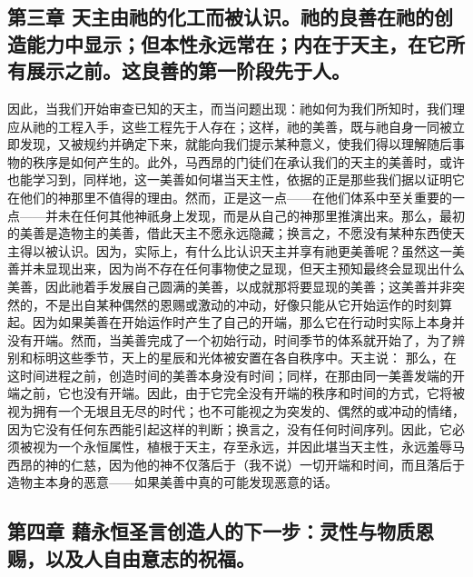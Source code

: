 
\subsection{第三章 天主由祂的化工而被认识。祂的良善在祂的创造能力中显示；但本性永远常在；内在于天主，在它所有展示之前。这良善的第一阶段先于人。}

因此，当我们开始审查已知的天主，而当问题出现：祂如何为我们所知时，我们理应从祂的工程入手，这些工程先于人存在；这样，祂的美善，既与祂自身一同被立即发现，又被规约并确定下来，就能向我们提示某种意义，使我们得以理解随后事物的秩序是如何产生的。此外，马西昂的门徒们在承认我们的天主的美善时，或许也能学习到，同样地，这一美善如何堪当天主性，依据的正是那些我们据以证明它在他们的神那里不值得的理由。然而，正是这一点——在他们体系中至关重要的一点——并未在任何其他神祇身上发现，而是从自己的神那里推演出来。那么，最初的美善是造物主的美善，借此天主不愿永远隐藏；换言之，不愿没有某种东西使天主得以被认识。因为，实际上，有什么比认识天主并享有祂更美善呢？虽然这一美善并未显现出来，因为尚不存在任何事物使之显现，但天主预知最终会显现出什么美善，因此祂着手发展自己圆满的美善，以成就那将要显现的美善；这美善并非突然的，不是出自某种偶然的恩赐或激动的冲动，好像只能从它开始运作的时刻算起。因为如果美善在开始运作时产生了自己的开端，那么它在行动时实际上本身并没有开端。然而，当美善完成了一个初始行动，时间季节的体系就开始了，为了辨别和标明这些季节，天上的星辰和光体被安置在各自秩序中。天主说： 那么，在这时间进程之前，创造时间的美善本身没有时间；同样，在那由同一美善发端的开端之前，它也没有开端。因此，由于它完全没有开端的秩序和时间的方式，它将被视为拥有一个无垠且无尽的时代；也不可能视之为突发的、偶然的或冲动的情绪，因为它没有任何东西能引起这样的判断；换言之，没有任何时间序列。因此，它必须被视为一个永恒属性，植根于天主，存至永远，并因此堪当天主性，永远羞辱马西昂的神的仁慈，因为他的神不仅落后于（我不说）一切开端和时间，而且落后于造物主本身的恶意——如果美善中真的可能发现恶意的话。\par


\subsection{第四章 藉永恒圣言创造人的下一步：灵性与物质恩赐，以及人自由意志的祝福。}

